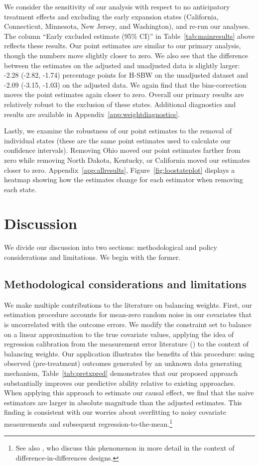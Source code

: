 \documentclass[aoas]{imsart}
\theoremstyle{plain}
\theoremstyle{remark}
\begin{document}
We consider the sensitivity of our analysis with respect to no anticipatory treatment effects and excluding the early expansion states (California, Connecticut, Minnesota, New Jersey, and Washington), and re-run our analyses. The column ``Early excluded estimate (95\% CI)'' in Table~\ref{tab:mainresults} above reflects these results. Our point estimates are similar to our primary analysis, though the numbers move slightly closer to zero. We also see that the difference between the estimates on the adjusted and unadjusted data is slightly larger: -2.28 (-2.82, -1.74) percentage points for H-SBW on the unadjusted dataset and -2.09 (-3.15, -1.03) on the adjusted data. We again find that the bias-correction moves the point estimates again closer to zero. Overall our primary results are relatively robust to the exclusion of these states. Additional diagnostics and results are available in Appendix~\ref{app:weightdiagnostics}.

Lastly, we examine the robustness of our point estimates to the removal of individual states (these are the same point estimates used to calculate our confidence intervals). Removing Ohio moved our point estimates farther from zero while removing North Dakota, Kentucky, or California moved our estimates closer to zero. Appendix~\ref{app:allresults}, Figure~\ref{fig:loostateplot} displays a heatmap showing how the estimates change for each estimator when removing each state.

\section{Discussion}

We divide our discussion into two sections: methodological and policy considerations and limitations. We begin with the former.

\subsection{Methodological considerations and limitations}

We make multiple contributions to the literature on balancing weights. First, our estimation procedure accounts for mean-zero random noise in our covariates that is uncorrelated with the outcome errors. We modify the constraint set to balance on a linear approximation to the true covariate values, applying the idea of regression calibration from the measurement error literature (\cite{gleser1992importance}) to the context of balancing weights. Our application illustrates the benefits of this procedure: using observed (pre-treatment) outcomes generated by an unknown data generating mechanism, Table~\ref{tab:pretxpred} demonstrates that our proposed approach substantially improves our predictive ability relative to existing approaches. When applying this approach to estimate our causal effect, we find that the naive estimators are larger in absolute magnitude than the adjusted estimates. This finding is consistent with our worries about overfitting to noisy covariate measurements and subsequent regression-to-the-mean.\footnote{See also \cite{daw2018matching}, who discuss this phenomenon in more detail in the context of difference-in-differences designs.}
\end{document}
